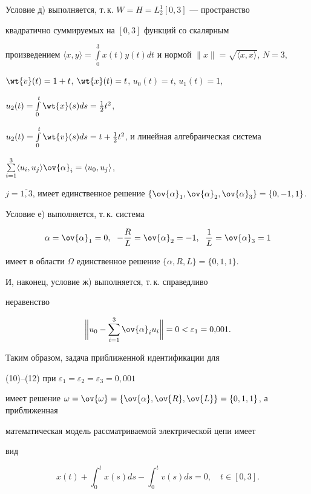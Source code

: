 \begin{exam}
Условие д) выполняется, т.\,к. $W=H=L^1_2[0,3]$ --- пространство


квадратично суммируемых на $[0,3]$ функций со скалярным


произведением $\langle x,y\rangle = \int\limits^3_0


x(t)y(t)dt$ и нормой $\|x\| = \sqrt{\langle x,x\rangle}$, $N=3$,


$\wt{v}(t)=1+t$, $\wt{x}(t)=t$, $u_0(t)=t$, $u_1(t)=1$,


$u_2(t)=\int\limits^t_0\wt{x}(s)ds =


\frac{1}{2}t^2$,


$u_2(t)=\int\limits^t_0\wt{v}(s)ds = t+


\frac{1}{2}t^2$, и линейная алгебраическая система


$\sum\limits^3_{i=1}\langle


u_i,u_j\rangle\ov{\alpha}_i = \langle u_0,u_j\rangle$,


$j=\overline{1,3}$, имеет единственное решение $\{\ov{\alpha}_1,


\ov{\alpha}_2, \ov{\alpha}_3\} = \{0,-1,1\}$.





Условие е) выполняется, т.\,к. система


$$


\alpha=\ov{\alpha}_1=0,\ \; -\frac{R}{L}=\ov{\alpha}_2=-1,


\ \; \frac{1}{L}=\ov{\alpha}_3 =1


$$


имеет в области $\Omega$ единственное решение $\{\alpha,R,L\} =


\{0,1,1\}$.





И, наконец, условие ж) выполняется, т.\,к. справедливо


неравенство


$$


\bigg\|u_0-\sum\limits^3_{i=1}\ov{\alpha}_iu_i\bigg\| = 0 < \varepsilon_1


= 0{,}001.


$$


Таким образом, задача приближенной идентификации для


(10)--(12) при $\varepsilon_1 = \varepsilon_2 = \varepsilon_3 = 0{,}001$


имеет решение $\omega=\ov{\omega} =


\{\ov{\alpha},\ov{R},\ov{L}\} = \{0,1,1\}$, а приближенная


математическая модель рассматриваемой электрической цепи имеет


вид


$$


x(t)+\int^t_0 x(s)ds - \int^t_0 v(s)ds = 0, \quad


t\in [0,3].


$$


\end{exam}









